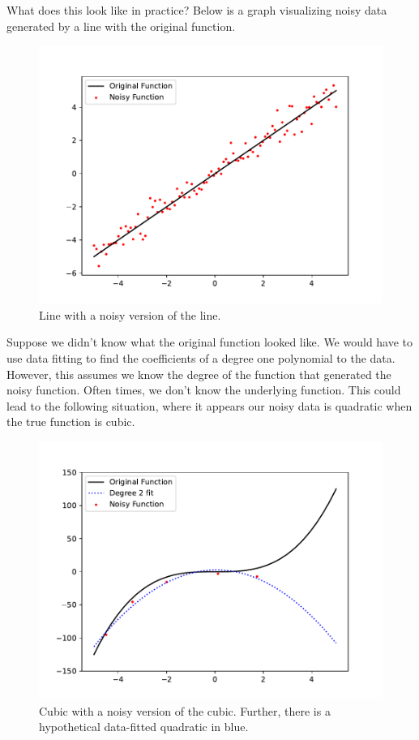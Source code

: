 \documentclass{article}
\begin{document}
What does this look like in practice? Below is a graph visualizing noisy data generated by a line with the original function. 

\begin{figure}[H]
    \centering
    \includegraphics[width=12cm]{../Images/intro_1.pdf}
    \caption{Line with a noisy version of the line.}
\end{figure}

Suppose we didn't know what the original function looked like. We would have to use data fitting to find the coefficients of a degree one polynomial to the data. However, this assumes we know the degree of the function that generated the noisy function. Often times, we don't know the underlying function. This could lead to the following situation, where it appears our noisy data is quadratic when the true function is cubic.

\begin{figure}[H]
    \centering
    \includegraphics[width=12cm]{../Images/intro_2.pdf}
    \caption{Cubic with a noisy version of the cubic. Further, there is a hypothetical data-fitted quadratic in blue.}
\end{figure}
\end{document}
